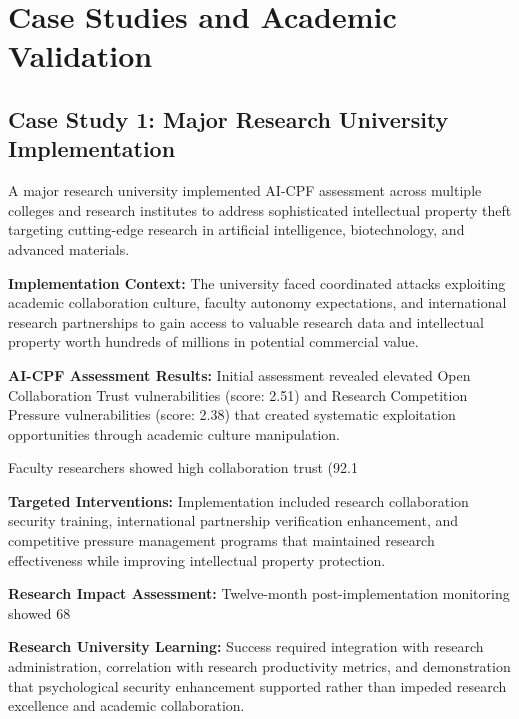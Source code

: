 \documentclass[10pt, twocolumn]{article}
\begin{document}
\section{Case Studies and Academic Validation}

\subsection{Case Study 1: Major Research University Implementation}

A major research university implemented AI-CPF assessment across multiple colleges and research institutes to address sophisticated intellectual property theft targeting cutting-edge research in artificial intelligence, biotechnology, and advanced materials.

\textbf{Implementation Context:} The university faced coordinated attacks exploiting academic collaboration culture, faculty autonomy expectations, and international research partnerships to gain access to valuable research data and intellectual property worth hundreds of millions in potential commercial value.

\textbf{AI-CPF Assessment Results:} Initial assessment revealed elevated Open Collaboration Trust vulnerabilities (score: 2.51) and Research Competition Pressure vulnerabilities (score: 2.38) that created systematic exploitation opportunities through academic culture manipulation.

Faculty researchers showed high collaboration trust (92.1%

\textbf{Targeted Interventions:} Implementation included research collaboration security training, international partnership verification enhancement, and competitive pressure management programs that maintained research effectiveness while improving intellectual property protection.

\textbf{Research Impact Assessment:} Twelve-month post-implementation monitoring showed 68%

\textbf{Research University Learning:} Success required integration with research administration, correlation with research productivity metrics, and demonstration that psychological security enhancement supported rather than impeded research excellence and academic collaboration.
\end{document}
